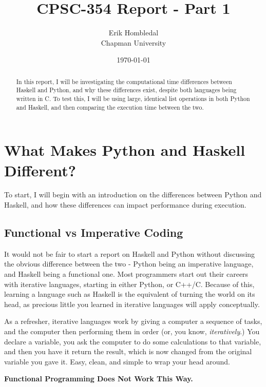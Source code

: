 \documentclass{article}
\title{CPSC-354 Report - Part 1}
\author{Erik Hombledal \\ Chapman University}
\date{\today}
\begin{document}
\maketitle

\begin{abstract}
In this report, I will be investigating the computational time differences between Haskell and Python, and why these differences exist, despite both languages being written in C. To test this, I will be using large, identical list operations in both Python and Haskell, and then comparing the execution time between the two.
\end{abstract}

\section{What Makes Python and Haskell Different?}
To start, I will begin with an introduction on the differences between Python and Haskell, and how these differences can impact performance during execution. 

    \subsection{Functional vs Imperative Coding}
    It would not be fair to start a report on Haskell and Python without discussing the obvious difference between the two - Python being an imperative language, and Haskell being a functional one. Most programmers start out their careers with iterative languages, starting in either Python, or C++/C. Because of this, learning a language such as Haskell is the equivalent of turning the world on its head, as precious little you learned in iterative languages will apply conceptually. 

    \medskip\noindent As a refresher, iterative languages work by giving a computer a sequence of tasks, and the computer then performing them in order (or, you know, \textit{iteratively}.) You declare a variable, you ask the computer to do some calculations to that variable, and then you have it return the result, which is now changed from the original variable you gave it. Easy, clean, and simple to wrap your head around. 
    
    \medskip\noindent\textbf{Functional Programming Does Not Work This Way.} 
    
\end{document}
